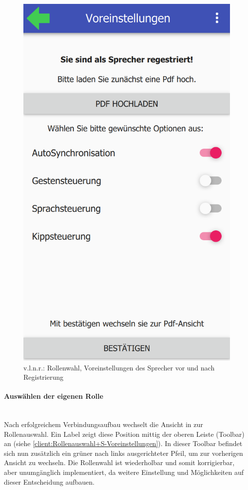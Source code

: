 \begin{figure}[ht!]
\begin{minipage}{0.31\linewidth}
		\includegraphics[scale=0.5]{GUI/Bilder/3-S-5-Voreinstellung.PNG}
	\end{minipage}
	\caption{v.l.n.r.: Rollenwahl, Voreinstellungen des Sprecher vor und nach Registrierung{\tiny}}
	\label{client:Rollenauswahl+S-Voreinstellungen}
\end{figure}

\newpage

\paragraph{Auswählen der eigenen Rolle}$\;$\\
Nach erfolgreichem Verbindungsaufbau wechselt die Ansicht in zur Rollenauswahl. Ein Label zeigt diese Position mittig der oberen Leiste (Toolbar) an (siehe \autoref{client:Rollenauswahl+S-Voreinstellungen}).
In dieser Toolbar befindet sich nun zusätzlich ein grüner nach links ausgerichteter Pfeil, um zur vorherigen Ansicht zu wechseln. Die Rollenwahl ist wiederholbar und somit korrigierbar, aber unumgänglich implementiert, da weitere Einstellung und Möglichkeiten auf dieser Entscheidung aufbauen.
